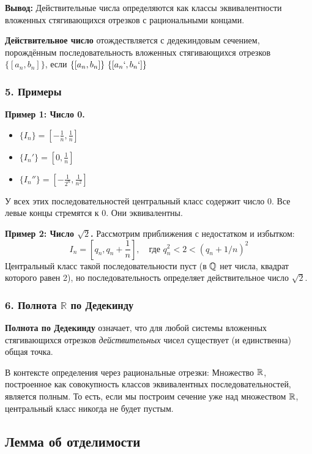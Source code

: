 \textbf{Вывод:} Действительные числа определяются как классы эквивалентности вложенных стягивающихся отрезков с рациональными концами.

\textbf{Действительное число} отождествляется с дедекиндовым сечением, порождённым последовательность вложенных стягивающихся отрезков $\{[a_n, b_n]\}$, если $\{[a_n,b_n]\} ~ \{[a_n`, b_n`]\}$

\subsubsection*{5. Примеры}

\textbf{Пример 1: Число 0.}
\begin{itemize}
    \item $\{I_n\} = [-\frac{1}{n}, \frac{1}{n}]$
    \item $\{I_n'\} = [0, \frac{1}{n}]$
    \item $\{I_n''\} = [-\frac{1}{2^n}, \frac{1}{n^2}]$
\end{itemize}
У всех этих последовательностей центральный класс содержит число $0$. Все левые концы стремятся к 0. Они эквивалентны.

\textbf{Пример 2: Число $\sqrt{2}$.}
Рассмотрим приближения с недостатком и избытком:
$$ I_n = \left[ q_n, q_n + \frac{1}{n} \right], \quad \text{где } q_n^2 < 2 < (q_n + 1/n)^2 $$
Центральный класс такой последовательности пуст (в $\mathbb{Q}$ нет числа, квадрат которого равен 2), но последовательность определяет действительное число $\sqrt{2}$.

\subsubsection*{6. Полнота $\mathbb{R}$ по Дедекинду}

\begin{tcolorbox}
\textbf{Полнота по Дедекинду} означает, что для любой системы вложенных стягивающихся отрезков \textit{действительных} чисел существует (и единственна) общая точка.
\end{tcolorbox}

В контексте определения через рациональные отрезки:
Множество $\mathbb{R}$, построенное как совокупность классов эквивалентных последовательностей, является полным. То есть, если мы построим сечение уже над множеством $\mathbb{R}$, центральный класс никогда не будет пустым.


\newpage

\subsection{Лемма об отделимости}

